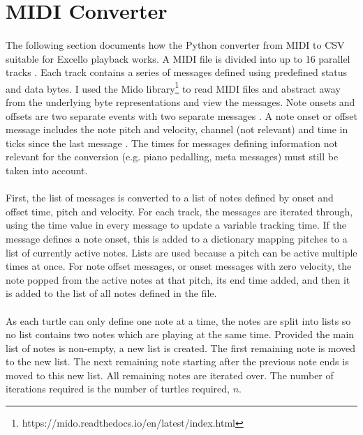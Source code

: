 \section{MIDI Converter}

\paragraph{} The following section documents how the Python converter from MIDI to CSV suitable for Excello playback works. A MIDI file is divided into up to 16 parallel tracks \cite{midiSpec}. Each track contains a series of messages defined using predefined status and data bytes. I used the Mido library\footnote{https://mido.readthedocs.io/en/latest/index.html} to read MIDI files and abstract away from the underlying byte representations and view the messages. Note onsets and offsets are two separate events with two separate messages \cite{midiSpec}. A note onset or offset message includes the note pitch and velocity, channel (not relevant) and time in ticks since the last message \cite{midoSpec}. The times for messages defining information not relevant for the conversion (e.g. piano pedalling, meta messages) must still be taken into account.

\paragraph{} First, the list of messages is converted to a list of notes defined by onset and offset time, pitch and velocity. For each track, the messages are iterated through, using the time value in every message to update a variable tracking time. If the message defines a note onset, this is added to a dictionary mapping pitches to a list of currently active notes. Lists are used because a pitch can be active multiple times at once. For note offset messages, or onset messages with zero velocity, the note popped from the active notes at that pitch, its end time added, and then it is added to the list of all notes defined in the file.

\paragraph{} As each turtle can only define one note at a time, the notes are split into lists so no list contains two notes which are playing at the same time. Provided the main list of notes is non-empty, a new list is created. The first remaining note is moved to the new list. The next remaining note starting after the previous note ends is moved to this new list. All remaining notes are iterated over. The number of iterations required is the number of turtles required, $n$.

